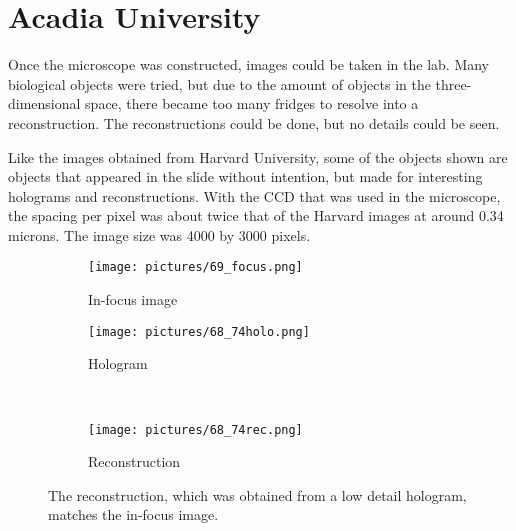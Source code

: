 %
%

\section{Acadia University}

Once the microscope was constructed, images could be taken in the lab. Many
biological objects were tried, but due to the amount of objects in the
three-dimensional space, there became too many fridges to resolve into a
reconstruction. The reconstructions could be done, but no details could be
seen.

Like the images obtained from Harvard University, some of the objects shown are
objects that appeared in the slide without intention, but made for interesting
holograms and reconstructions. With the CCD that was used in the microscope,
the spacing per pixel was about twice that of the Harvard images at around 0.34
microns. The image size was 4000 by 3000 pixels.

\begin{figure}[ht!]
    \begin{center}

        \begin{subfigure}[t]{0.4\textwidth}
            \label{fig:69_focus}
            \texttt{[image: pictures/69\_focus.png]}
            \caption{In-focus image}
        \end{subfigure}
        \begin{subfigure}[t]{0.4\textwidth}
            \label{fig:68_74holo}
            \texttt{[image: pictures/68\_74holo.png]}
            \caption{Hologram}
        \end{subfigure}
        \\
        \begin{subfigure}[t]{\textwidth}
            \label{fig:68_74rec}
            \texttt{[image: pictures/68\_74rec.png]}
            \caption{Reconstruction}
        \end{subfigure}


    \end{center}
    \caption{%
        The reconstruction, which was obtained from a low detail hologram,
        matches the in-focus image.
    }%
    \label{fig:68_74}
\end{figure}



